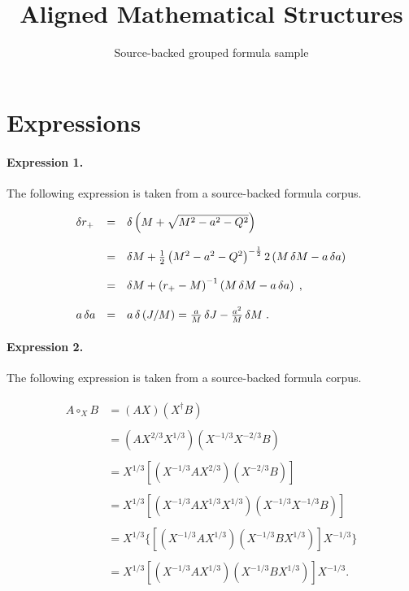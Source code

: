 \documentclass[11pt]{article}
\title{Aligned Mathematical Structures}
\author{Source-backed grouped formula sample}
\date{}
\begin{document}
\maketitle
\section{Expressions}
\paragraph{Expression 1.} The following expression is taken from a source-backed formula corpus.

\begin{align*}\begin{array}{lll}\delta r_+&=&\delta\left(M+\sqrt{M^2-a^2-Q^2}\right)\\\\&=&\delta M+{1\over2}\,{\left(M^2-a^2-Q^2\right)}^{-{1\over2}}\,2\left(M\,\delta M-a\,\delta a\right)\\\\&=&\delta M+{\left(r_+-M\right)}^{-1}\left(M\,\delta M-a\,\delta a\right)\;,\\\\a\,\delta a&=&a\,\delta\left(J/M\right)={a\over M}\,\delta J-{a^2\over M}\,\delta M\;.\end{array}\end{align*}

\paragraph{Expression 2.} The following expression is taken from a source-backed formula corpus.

\begin{align*}\begin{array}{rl}A\circ_{X}B & = (AX)(X^{ \dagger }B) \\ \\& = (AX^{2/3}X^{1/3})(X^{-1/3}X^{-2/3}B) \\ \\& = X^{1/3}[(X^{-1/3}AX^{2/3})(X^{-2/3}B)] \\ \\& = X^{1/3}[(X^{-1/3}AX^{1/3}X^{1/3})(X^{-1/3}X^{-1/3}B)] \\ \\& = X^{1/3}\{[(X^{-1/3}AX^{1/3})(X^{-1/3}BX^{1/3})]X^{-1/3}\} \\\\ & = X^{1/3}[(X^{-1/3}AX^{1/3})(X^{-1/3}BX^{1/3})]X^{-1/3}. \\\end{array}\end{align*}
\end{document}
